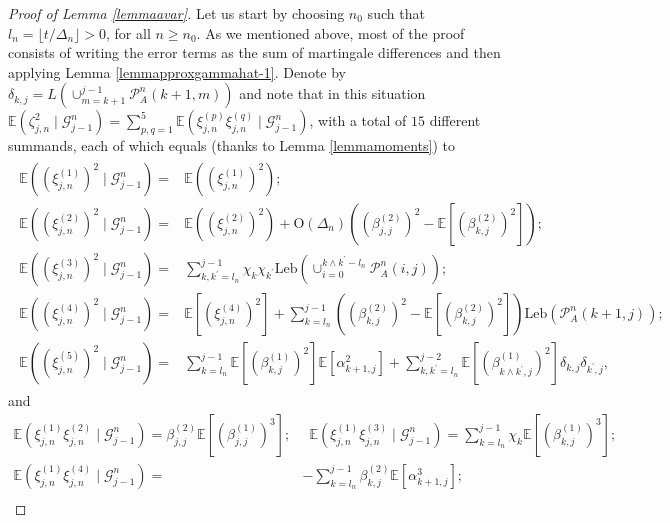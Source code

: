 \documentclass{article}
\theoremstyle{plain}
\theoremstyle{definition}
\theoremstyle{remark}
\newcommand{\Leb}{\ensuremath{\mathrm{Leb}}}
\begin{document}
\begin{appendix}
\begin{proof}[Proof of Lemma \ref{lemmaavar}] Let us start by choosing $n_{0}$ such that $l_{n}=\lfloor t/\Delta_{n}\rfloor>0$, for all $n\geq n_{0}$. As we mentioned above, most of the proof consists of writing the error terms as the sum of martingale differences and then applying Lemma \ref{lemmapproxgammahat-1}.
	Denote by $\delta_{k,j}=L(\cup_{m=k+1}^{j-1}\mathcal{P}_{A}^{n}(k+1,m))$
	and note that in this situation $
\mathbb{E}(\zeta_{j,n}^{2}\mid\mathscr{G}_{j-1}^{n})=\sum_{p,q=1}^{5}\mathbb{E}(\xi_{j,n}^{(p)}\xi_{j,n}^{(q)}\mid\mathscr{G}_{j-1}^{n})$, with a total of $15$ different summands, each of which equals (thanks
	to Lemma \ref{lemmamoments}) to 
	\begin{align}
		\begin{aligned}\mathbb{E}((\xi_{j,n}^{(1)})^{2}\mid\mathscr{G}_{j-1}^{n})= & \mathbb{E}((\xi_{j,n}^{(1)})^{2});\\
			\mathbb{E}((\xi_{j,n}^{(2)})^{2}\mid\mathscr{G}_{j-1}^{n})= & \mathbb{E}((\xi_{j,n}^{(2)})^{2})+\mathrm{O}(\Delta_{n})\left((\beta_{j,j}^{(2)})^{2}-\mathbb{E}[(\beta_{k,j}^{(2)})^{2}]\right);\\
			\mathbb{E}((\xi_{j,n}^{(3)})^{2}\mid\mathscr{G}_{j-1}^{n})= & \sum_{k,k^{\prime}=l_{n}}^{j-1}\chi_{k}\chi_{k^{\prime}}\Leb(\cup_{i=0}^{k\land k^{\prime}-l_{n}}\mathcal{P}_{A}^{n}(i,j));\\
			\mathbb{E}((\xi_{j,n}^{(4)})^{2}\mid\mathscr{G}_{j-1}^{n})= & \mathbb{E}[(\xi_{j,n}^{(4)})^{2}]+\sum_{k=l_{n}}^{j-1}\left((\beta_{k,j}^{(2)})^{2}-\mathbb{E}[(\beta_{k,j}^{(2)})^{2}]\right)\Leb(\mathcal{P}_{A}^{n}(k+1,j));\\
			\mathbb{E}((\xi_{j,n}^{(5)})^{2}\mid\mathscr{G}_{j-1}^{n})= & \sum_{k=l_{n}}^{j-1}\mathbb{E}[(\beta_{k,j}^{(1)})^{2}]\mathbb{E}[\alpha_{k+1,j}^{2}]+\sum_{k,k^{\prime}=l_{n}}^{j-2}\mathbb{E}[(\beta_{k\land k^{\prime},j}^{(1)})^{2}]\delta_{k,j}\delta_{k^{\prime},j},
		\end{aligned}
		\label{eq:condvariances}
	\end{align} 
	and 
	\begin{equation}
		\begin{aligned}\mathbb{E}(\xi_{j,n}^{(1)}\xi_{j,n}^{(2)}\mid\mathscr{G}_{j-1}^{n})=\beta_{j,j}^{(2)}\mathbb{E}[(\beta_{j,j}^{(1)})^{3}]; & \,\,\,\mathbb{E}(\xi_{j,n}^{(1)}\xi_{j,n}^{(3)}\mid\mathscr{G}_{j-1}^{n})=\sum_{k=l_{n}}^{j-1}\chi_{k}\mathbb{E}[(\beta_{k,j}^{(1)})^{3}];\\
			\mathbb{E}(\xi_{j,n}^{(1)}\xi_{j,n}^{(4)}\mid\mathscr{G}_{j-1}^{n})= & -\sum_{k=l_{n}}^{j-1}\beta_{k,j}^{(2)}\mathbb{E}[\alpha_{k+1,j}^{3}];\\

\end{aligned}
\end{equation}
\end{proof}
\end{appendix}
\end{document}
